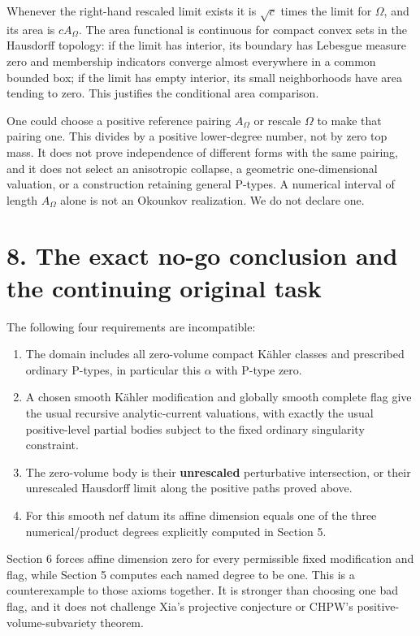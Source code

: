 \documentclass[11pt]{article}
\begin{document}
Whenever the right-\allowbreak{}hand rescaled limit exists it is $\sqrt c$ times the limit for $\Omega$, and its area is $cA_\Omega$. The area functional is continuous for compact convex sets in the Hausdorff topology: if the limit has interior, its boundary has Lebesgue measure zero and membership indicators converge almost everywhere in a common bounded box; if the limit has empty interior, its small neighborhoods have area tending to zero. This justifies the conditional area comparison.

One could choose a positive reference pairing $A_\Omega$ or rescale $\Omega$ to make that pairing one. This divides by a positive lower-\allowbreak{}degree number, not by zero top mass. It does not prove independence of different forms with the same pairing, and it does not select an anisotropic collapse, a geometric one-\allowbreak{}dimensional valuation, or a construction retaining general P-\allowbreak{}types. A numerical interval of length $A_\Omega$ alone is not an Okounkov realization. We do not declare one.

\section*{8. The exact no-\allowbreak{}go conclusion and the continuing original task}

The following four requirements are incompatible:

\begin{enumerate}
\item[1.] The domain includes all zero-\allowbreak{}volume compact Kähler classes and prescribed ordinary P-\allowbreak{}types, in particular this $\alpha$ with P-\allowbreak{}type zero.
\item[2.] A chosen smooth Kähler modification and globally smooth complete flag give the usual recursive analytic-\allowbreak{}current valuations, with exactly the usual positive-\allowbreak{}level partial bodies subject to the fixed ordinary singularity constraint.
\item[3.] The zero-\allowbreak{}volume body is their \textbf{unrescaled} perturbative intersection, or their unrescaled Hausdorff limit along the positive paths proved above.
\item[4.] For this smooth nef datum its affine dimension equals one of the three numerical/\allowbreak{}product degrees explicitly computed in Section 5.

\end{enumerate}
Section 6 forces affine dimension zero for every permissible fixed modification and flag, while Section 5 computes each named degree to be one. This is a counterexample to those axioms together. It is stronger than choosing one bad flag, and it does not challenge Xia's projective conjecture or CHPW's positive-\allowbreak{}volume-\allowbreak{}subvariety theorem.
\end{document}
